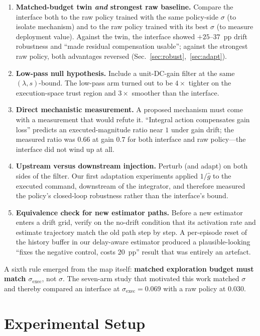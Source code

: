 \documentclass[conference]{IEEEtran}
\newcommand{\sexec}{\sigma_{\mathrm{exec}}}
\begin{document}
\begin{enumerate}
\item \textbf{Matched-budget twin \emph{and} strongest raw baseline.} Compare the interface both to the raw policy trained with the same policy-side $\sigma$ (to isolate mechanism) and to the raw policy trained with its best $\sigma$ (to measure deployment value). Against the twin, the interface showed $+25$--$37$~pp drift robustness and ``made residual compensation usable''; against the strongest raw policy, both advantages reversed (Sec.~\ref{sec:robust},~\ref{sec:adapt}).
\item \textbf{Low-pass null hypothesis.} Include a unit-DC-gain filter at the same $(\lambda,s)$-bound. The low-pass arm turned out to be $4\times$ tighter on the execution-space trust region and $3\times$ smoother than the interface.
\item \textbf{Direct mechanistic measurement.} A proposed mechanism must come with a measurement that would refute it. ``Integral action compensates gain loss'' predicts an executed-magnitude ratio near $1$ under gain drift; the measured ratio was $0.66$ at gain $0.7$ for both interface and raw policy---the interface did not wind up at all.
\item \textbf{Upstream versus downstream injection.} Perturb (and adapt) on both sides of the filter. Our first adaptation experiments applied $1/\hat g$ to the executed command, downstream of the integrator, and therefore measured the policy's closed-loop robustness rather than the interface's bound.
\item \textbf{Equivalence check for new estimator paths.} Before a new estimator enters a drift grid, verify on the no-drift condition that its activation rate and estimate trajectory match the old path step by step. A per-episode reset of the history buffer in our delay-aware estimator produced a plausible-looking ``fixes the negative control, costs 20~pp'' result that was entirely an artefact.
\end{enumerate}
A sixth rule emerged from the map itself: \textbf{matched exploration budget must match $\sexec$}, not $\sigma$. The seven-arm study that motivated this work matched $\sigma$ and thereby compared an interface at $\sexec=0.069$ with a raw policy at $0.030$.

\section{Experimental Setup}
\end{document}
